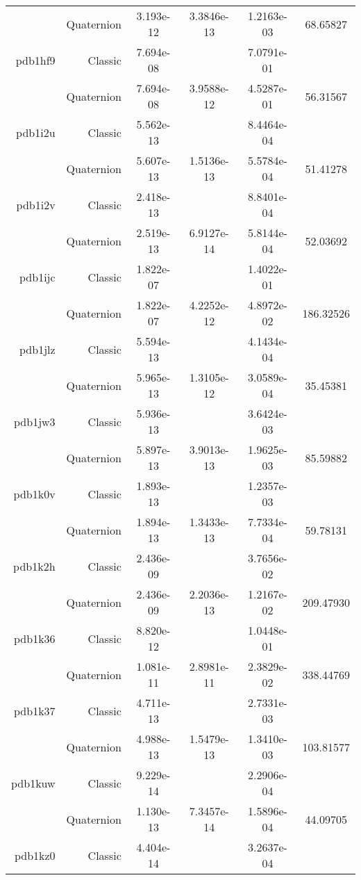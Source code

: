 \begin{xltabular}{\textwidth}{r|rS[table-format=1.3e+2]S[table-format=1.4e+2]S[table-format=1.4e+2]S[table-format=-1.5]}
& Quaternion & 3.193e-12 & 3.3846e-13 & 1.2163e-03 & 68.65827\\  \addlinespace
pdb1hf9 & Classic & 7.694e-08 &  & 7.0791e-01 & \\
& Quaternion & 7.694e-08 & 3.9588e-12 & 4.5287e-01 & 56.31567\\  \addlinespace
pdb1i2u & Classic & 5.562e-13 &  & 8.4464e-04 & \\
& Quaternion & 5.607e-13 & 1.5136e-13 & 5.5784e-04 & 51.41278\\  \addlinespace
pdb1i2v & Classic & 2.418e-13 &  & 8.8401e-04 & \\
& Quaternion & 2.519e-13 & 6.9127e-14 & 5.8144e-04 & 52.03692\\  \addlinespace
pdb1ijc & Classic & 1.822e-07 &  & 1.4022e-01 & \\
& Quaternion & 1.822e-07 & 4.2252e-12 & 4.8972e-02 & 186.32526\\  \addlinespace
pdb1jlz & Classic & 5.594e-13 &  & 4.1434e-04 & \\
& Quaternion & 5.965e-13 & 1.3105e-12 & 3.0589e-04 & 35.45381\\  \addlinespace
pdb1jw3 & Classic & 5.936e-13 &  & 3.6424e-03 & \\
& Quaternion & 5.897e-13 & 3.9013e-13 & 1.9625e-03 & 85.59882\\  \addlinespace
pdb1k0v & Classic & 1.893e-13 &  & 1.2357e-03 & \\
& Quaternion & 1.894e-13 & 1.3433e-13 & 7.7334e-04 & 59.78131\\  \addlinespace
pdb1k2h & Classic & 2.436e-09 &  & 3.7656e-02 & \\
& Quaternion & 2.436e-09 & 2.2036e-13 & 1.2167e-02 & 209.47930\\  \addlinespace
pdb1k36 & Classic & 8.820e-12 &  & 1.0448e-01 & \\
& Quaternion & 1.081e-11 & 2.8981e-11 & 2.3829e-02 & 338.44769\\  \addlinespace
pdb1k37 & Classic & 4.711e-13 &  & 2.7331e-03 & \\
& Quaternion & 4.988e-13 & 1.5479e-13 & 1.3410e-03 & 103.81577\\  \addlinespace
pdb1kuw & Classic & 9.229e-14 &  & 2.2906e-04 & \\
& Quaternion & 1.130e-13 & 7.3457e-14 & 1.5896e-04 & 44.09705\\  \addlinespace
pdb1kz0 & Classic & 4.404e-14 &  & 3.2637e-04 & \\

\end{xltabular}
